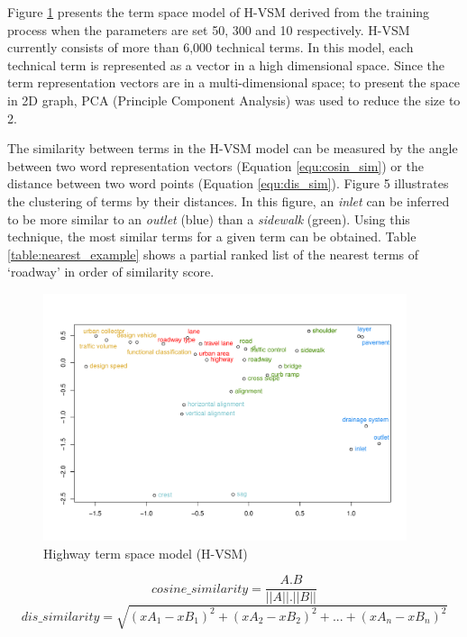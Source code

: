 \documentclass[Journal,InsideFigs, DoubleSpace]{ascelike} %
\begin{document}
%
\par
Figure \ref{fig:hvsm} presents the term space model of H-VSM derived from the training process when the parameters are set 50, 300 and 10 respectively. H-VSM currently consists of more than 6,000 technical terms. In this model, each technical term is represented as a vector in a high dimensional space. Since the term representation vectors are in a multi-dimensional space; to present the space in 2D graph, PCA (Principle Component Analysis) was used to reduce the size to 2.
\par
The similarity between terms in the H-VSM model can be measured by the angle between two word representation vectors (Equation \ref{equ:cosin_sim}) or the distance between two word points (Equation \ref{equ:dis_sim}). Figure 5 illustrates the clustering of terms by their distances. In this figure, an \textit{inlet} can be inferred to be more similar to an \textit{outlet} (blue) than a \textit{sidewalk} (green). Using this technique, the most similar terms for a given term can be obtained. Table \ref{table:nearest_example} shows a partial ranked list of the nearest terms of `roadway' in order of similarity score.
%
\begin{figure}[t]
	\centering
	\includegraphics[width=0.95\textwidth]{Figure5_hvsm_space}
	\caption{Highway term space model (H-VSM)}
	\label{fig:hvsm}
\end{figure}
%
\begin{equation}
\label{equ:cosin_sim}
cosine\_similarity = \frac{A.B}{||A||.||B||}
\end{equation}
%
\begin{equation}
\label{equ:dis_sim}
dis\_similarity =\sqrt{(xA_1-xB_1)^2+(xA_2-xB_2)^2+...+(xA_n-xB_n)^2}
\end{equation}
\end{document}
